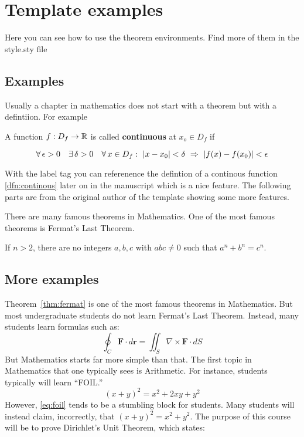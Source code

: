 \newpage
\section{Template examples \label{sec:9999_ex}}
Here you can see how to use the theorem environments. Find more of them in the style.sty file

\subsection{Examples \label{sec:fermat}}

Usually a chapter in mathematics does not start with a theorem but with a defintiion. For example

\begin{dfn} \label{dfn:continous}
A function $f: D_f \rightarrow \mathbb{R}$ is called \textbf{continuous}  at $x_o \in D_f$ if \par
\begin{equation*}
    \forall \, \epsilon > 0 \quad  \exists \, \delta > 0 \quad  \forall \, x \in D_f : \ \abs{x-x_0} < \delta \  \Rightarrow  \ \abs{f(x) - f(x_0)} < \epsilon
\end{equation*}
\end{dfn}

With the label tag you can referenence the defintion of a continous function \ref{dfn:continous} later on in the manuscript which is a nice feature. The following parts are from the original author of the template showing some more features.

There are many famous theorems in Mathematics. One of the most famous theorems is Fermat's Last Theorem.

\begin{thm} \label{thm:fermat}
If $n>2$, there are no integers $a,b,c$ with $abc \neq 0$ such that $a^n + b^n= c^n$.
\end{thm}


\subsection{More examples}

Theorem~\ref{thm:fermat} is one of the most famous theorems in Mathematics. But most undergraduate students do not learn Fermat's Last Theorem. Instead, many students learn formulas such as:
	\[
	\oint_C \mathbf{F} \cdot d\mathbf{r} = \iint_S \nabla \times \mathbf{F} \cdot dS
	\]
But Mathematics starts far more simple than that. The first topic in Mathematics that one typically sees is Arithmetic. For instance, students typically will learn ``FOIL.'' 
	\begin{equation} \label{eq:foil}
	(x + y)^2= x^2 + 2xy + y^2
	\end{equation}
However, \eqref{eq:foil} tends to be a stumbling block for students. Many students will instead claim, incorrectly, that $(x+y)^2= x^2 + y^2$. The purpose of this course will be to prove Dirichlet's Unit Theorem, which states:

